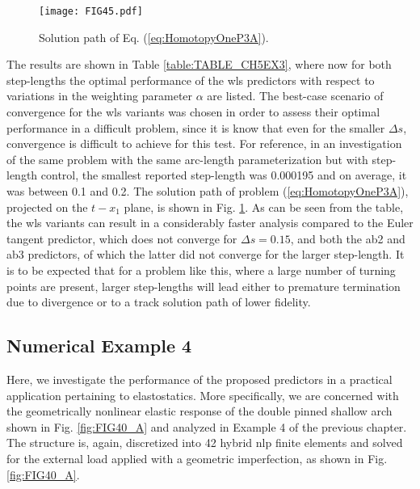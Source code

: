 \begin{figure}[b!]
	\centering
	\texttt{[image: FIG45.pdf]}
	\caption{Solution path of Eq. (\ref{eq:HomotopyOneP3A}).}
	\label{fig:FIG45}
\end{figure}

The results are shown in Table \ref{table:TABLE_CH5EX3}, where now for both 
step-lengths
the optimal performance of the \acrshort{wls} predictors with respect to 
variations in 
the weighting parameter $\alpha$ are listed. The best-case scenario of 
convergence for the \acrshort{wls} variants was chosen in order to assess their 
optimal performance in a difficult problem, since it is know that even for the 
smaller $\Delta s$, convergence is difficult to achieve for this test. For 
reference, in an
investigation\cite{Georg81} of the same problem with the same arc-length
parameterization but with step-length control, the smallest reported step-length
was 0.000195 and on average, it was between 0.1 and 0.2. The solution
path of problem (\ref{eq:HomotopyOneP3A}), projected on the $t-x_1$
plane, is shown in Fig. \ref{fig:FIG45}. As can be seen from the table, the 
\acrshort{wls} variants can result in a considerably faster analysis compared 
to the Euler tangent predictor, which does not converge for $\Delta s= 0.15$, 
and both the \acrshort{ab2} and \acrshort{ab3} predictors, of which the latter 
did not converge for the larger step-length. It is to be expected that for a 
problem like this, where a large number of turning points are present, larger 
step-lengths will lead either to premature termination due to divergence or to 
a track solution path of lower fidelity. 


\subsection{Numerical Example 4}
Here, we investigate the performance of the proposed predictors in a
practical application pertaining to elastostatics. More specifically, we are
concerned with the geometrically nonlinear elastic response of the double pinned
shallow arch shown in Fig. \ref{fig:FIG40_A} and analyzed in Example 4 of the 
previous chapter. The structure is, again,
discretized into 42 hybrid \acrshort{nlp} finite elements and solved for the 
external load
applied with a geometric imperfection, as shown in Fig. \ref{fig:FIG40_A}.

%	
%	

